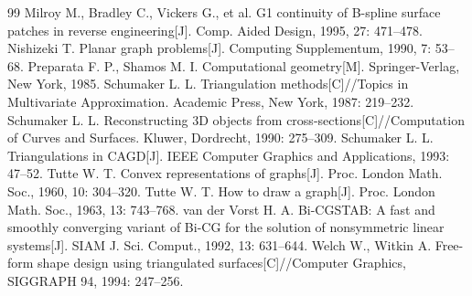 \documentclass{ctexart}
\theoremstyle{proof}
\begin{document}
\begin{thebibliography}{99}
     Milroy M., Bradley C., Vickers G., et al. G1 continuity of B-spline surface patches in reverse engineering[J]. Comp. Aided Design, 1995, 27: 471–478.
     Nishizeki T. Planar graph problems[J]. Computing Supplementum, 1990, 7: 53–68.
     Preparata F. P., Shamos M. I. Computational geometry[M]. Springer-Verlag, New York, 1985.
     Schumaker L. L. Triangulation methods[C]//Topics in Multivariate Approximation. Academic Press, New York, 1987: 219–232.
     Schumaker L. L. Reconstructing 3D objects from cross-sections[C]//Computation of Curves and Surfaces. Kluwer, Dordrecht, 1990: 275–309.
     Schumaker L. L. Triangulations in CAGD[J]. IEEE Computer Graphics and Applications, 1993: 47–52.
     Tutte W. T. Convex representations of graphs[J]. Proc. London Math. Soc., 1960, 10: 304–320.
     Tutte W. T. How to draw a graph[J]. Proc. London Math. Soc., 1963, 13: 743–768.
     van der Vorst H. A. Bi-CGSTAB: A fast and smoothly converging variant of Bi-CG for the solution of nonsymmetric linear systems[J]. SIAM J. Sci. Comput., 1992, 13: 631–644.
     Welch W., Witkin A. Free-form shape design using triangulated surfaces[C]//Computer Graphics, SIGGRAPH 94, 1994: 247–256.
\end{thebibliography}
\end{document}
